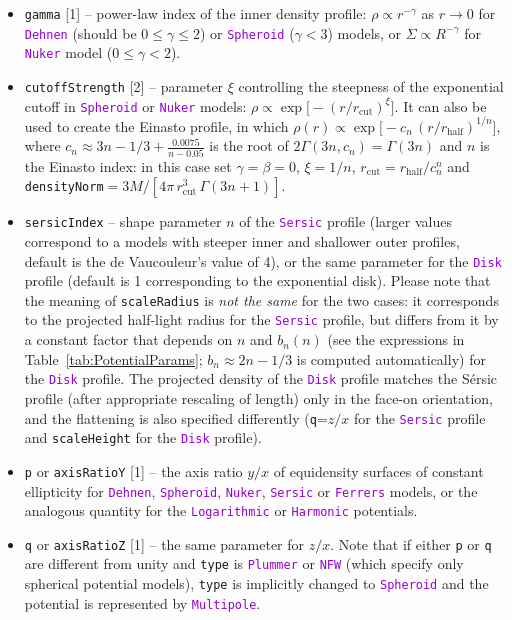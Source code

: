 \documentclass[12pt]{article}
\newcommand{\ttt}[1]{\textcolor{darkviolet}{\texttt{#1}}}
\newcommand{\ppp}[1]{\textcolor{darkolive} {\texttt{#1}}}
\begin{document}
\begin{itemize}
\item \ppp{gamma} [1] -- power-law index of the inner density profile: $\rho \propto r^{-\gamma}$ as $r\to 0$ for \ttt{Dehnen} (should be $0\le\gamma\le 2$) or \ttt{Spheroid} ($\gamma<3$) models, or $\Sigma \propto R^{-\gamma}$ for \ttt{Nuker} model ($0\le \gamma < 2$).
\item \ppp{cutoffStrength} [2] -- parameter $\xi$ controlling the steepness of the exponential cutoff in \ttt{Spheroid} or \ttt{Nuker} models: $\rho \propto \exp\big[-(r/r_\mathrm{cut})^\xi\big]$. It can also be used to create the Einasto profile, in which $\rho(r)\propto \exp\big[-c_n\,(r/r_\mathrm{half})^{1/n}\big]$, where $c_n\approx 3n-1/3+\frac{0.0075}{n-0.05}$ is the root of $2\Gamma(3n,c_n)=\Gamma(3n)$ and $n$ is the Einasto index: in this case set $\gamma=\beta=0$, $\xi=1/n$, $r_\mathrm{cut}=r_\mathrm{half}/c_n^n$ and \ppp{densityNorm}${}=3M / [4\pi\,r_\mathrm{cut}^3\,\Gamma(3n+1)]$.
\item \ppp{sersicIndex} -- shape parameter $n$ of the \ttt{Sersic} profile (larger values correspond to a models with steeper inner and shallower outer profiles, default is the de Vaucouleur's value of 4), or the same parameter for the \ttt{Disk} profile (default is 1 corresponding to the exponential disk). Please note that the meaning of \ppp{scaleRadius} is \textit{not the same} for the two cases: it corresponds to the projected half-light radius for the \ttt{Sersic} profile, but differs from it by a constant factor that depends on $n$ and $b_n(n)$ (see the expressions in Table~\ref{tab:PotentialParams}; $b_n\approx 2n-1/3$ is computed automatically) for the \ttt{Disk} profile. The projected density of the \ttt{Disk} profile matches the S\'ersic profile (after appropriate rescaling of length) only in the face-on orientation, and the flattening is also specified differently (\ppp{q}=$z/x$ for the \ttt{Sersic} profile and \ppp{scaleHeight} for the \ttt{Disk} profile).
\item \ppp{p} or \ppp{axisRatioY} [1] -- the axis ratio $y/x$ of equidensity surfaces of constant ellipticity for \ttt{Dehnen}, \ttt{Spheroid}, \ttt{Nuker}, \ttt{Sersic} or \ttt{Ferrers} models, or the analogous quantity for the \ttt{Logarithmic} or \ttt{Harmonic} potentials.
\item \ppp{q} or \ppp{axisRatioZ} [1] -- the same parameter for $z/x$. Note that if either \ppp{p} or \ppp{q} are different from unity and \ppp{type} is \ttt{Plummer} or \ttt{NFW} (which specify only spherical potential models), \ppp{type} is implicitly changed to \ttt{Spheroid} and the potential is represented by \ttt{Multipole}.

\end{itemize}
\end{document}
